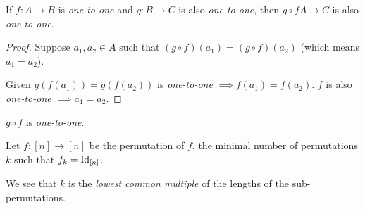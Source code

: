 \documentclass[00_complete]{subfiles}
\begin{document}
\begin{claim}
If $f: A \to B$ is \emph{one-to-one} and $g: B \to C$ is also
\emph{one-to-one}, then $g \circ f A \to C$ is also \emph{one-to-one}.
\end{claim}

\begin{proof}
Suppose $a_1, a_2 \in A$ such that $(g \circ f)(a_1)=(g \circ f)(a_2)$ (which
means $a_1=a_2$).

Given $g(f(a_1))=g(f(a_2))$ is \emph{one-to-one} $\implies f(a_1)=f(a_2)$. $f$
is also \emph{one-to-one} $\implies a_1=a_2$.
\end{proof}

\begin{conclusion}
$g \circ f$ is \emph{one-to-one}.
\end{conclusion}

\begin{definition}
Let $f: [n] \to [n]$ be the permutation of $f$, the minimal number of
permutations $k$ such that $f_k=\operatorname{Id}_{[n]}$.

We see that $k$ is the \emph{lowest common multiple} of the lengths of the
sub-permutations.
\end{definition}
\end{document}
